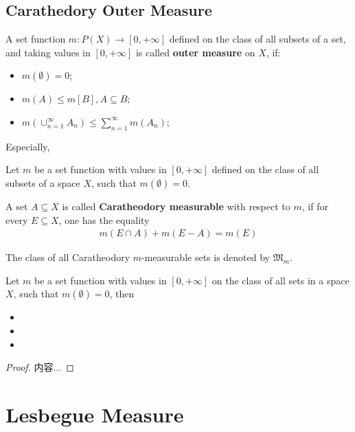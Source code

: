\documentclass[Total.tex]{subfiles}
\begin{document}
				
				
			\subsection{Carathedory Outer Measure}
				\begin{Def}
					A set function $m:P(X)\rightarrow [0,+\infty]$ defined on the class of all subsets of a set, and taking values in $[0,+\infty]$ is called \textbf{outer measure} on $X$, if:
					\begin{itemize}
						\item $m(\emptyset)=0$;
						\item $m(A)\leq m[B],A\subseteq B$;
						\item $m(\cup_{n=1}^\infty A_n)\leq \sum_{n=1}^\infty m(A_n)$;
					\end{itemize}
				\end{Def}
				
				Especially,
				\begin{Def}
					Let $m$ be a set function with values in $[0,+\infty]$ defined on the class of all subsets of a space $X$, such that $m(\emptyset)=0$. 
					
					A set $A\subseteq X$ is called \textbf{Caratheodory measurable} with respect to $m$, if for every $E\subseteq X$, one has the equality
					\begin{gather*}
						m(E\cap A)+m(E-A )=m(E)
					\end{gather*}
					
					The class of all Caratheodory $m$-measurable sets is denoted by $\mathfrak{M}_m$. 
				\end{Def}
				
				\begin{proposition}
					Let $m$ be a set function with values in $[0,+\infty]$ on the class of all sets in a space $X$, such that $m(\emptyset)=0$, then
					\begin{itemize}
						\item 
						\item 
						\item 
					\end{itemize}
				\end{proposition}
				\begin{proof}
					内容...
				\end{proof}
					\section{Lesbegue Measure}
\end{document}
